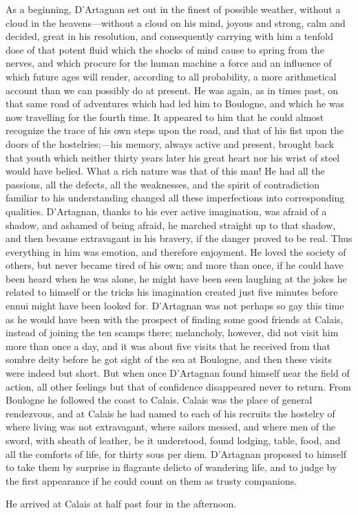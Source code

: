 As a beginning, D'Artagnan set out in the finest of possible weather, without a cloud in the heavens—without a cloud on his mind, joyous and strong, calm and decided, great in his resolution, and consequently carrying with him a tenfold dose of that potent fluid which the shocks of mind cause to spring from the nerves, and which procure for the human machine a force and an influence of which future ages will render, according to all probability, a more arithmetical account than we can possibly do at present. He was again, as in times past, on that same road of adventures which had led him to Boulogne, and which he was now travelling for the fourth time. It appeared to him that he could almost recognize the trace of his own steps upon the road, and that of his fist upon the doors of the hostelries;—his memory, always active and present, brought back that youth which neither thirty years later his great heart nor his wrist of steel would have belied. What a rich nature was that of this man! He had all the passions, all the defects, all the weaknesses, and the spirit of contradiction familiar to his understanding changed all these imperfections into corresponding qualities. D'Artagnan, thanks to his ever active imagination, was afraid of a shadow, and ashamed of being afraid, he marched straight up to that shadow, and then became extravagant in his bravery, if the danger proved to be real. Thus everything in him was emotion, and therefore enjoyment. He loved the society of others, but never became tired of his own; and more than once, if he could have been heard when he was alone, he might have been seen laughing at the jokes he related to himself or the tricks his imagination created just five minutes before ennui might have been looked for. D'Artagnan was not perhaps so gay this time as he would have been with the prospect of finding some good friends at Calais, instead of joining the ten scamps there; melancholy, however, did not visit him more than once a day, and it was about five visits that he received from that sombre deity before he got sight of the sea at Boulogne, and then these visits were indeed but short. But when once D'Artagnan found himself near the field of action, all other feelings but that of confidence disappeared never to return. From Boulogne he followed the coast to Calais. Calais was the place of general rendezvous, and at Calais he had named to each of his recruits the hostelry of  where living was not extravagant, where sailors messed, and where men of the sword, with sheath of leather, be it understood, found lodging, table, food, and all the comforts of life, for thirty sous per diem. D'Artagnan proposed to himself to take them by surprise in flagrante delicto of wandering life, and to judge by the first appearance if he could count on them as trusty companions.

He arrived at Calais at half past four in the afternoon. 